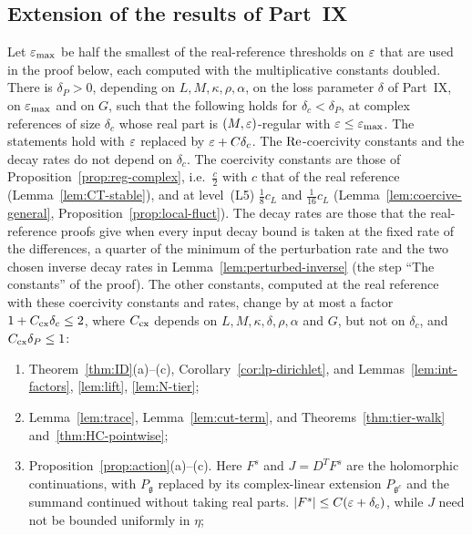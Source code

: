 \subsection{Extension of the results of Part~IX}\label{sec:complex-ext}

\begin{proposition}\label{prop:complex-ext}
Let $\varepsilon_{\max}$ be half the smallest of the real-reference thresholds on $\varepsilon$ that are used in the proof below, each computed with the multiplicative constants doubled. There is $\delta_P>0$, depending on $L,M,\kappa,\rho,\alpha$, on the loss parameter $\delta$ of Part~IX, on $\varepsilon_{\max}$ and on $G$, such that the following holds for $\delta_c<\delta_P$, at complex references of size $\delta_c$ whose real part is $(M,\varepsilon)$-regular with $\varepsilon\le\varepsilon_{\max}$. The statements hold with $\varepsilon$ replaced by $\varepsilon+C\delta_c$. The $\operatorname{Re}$-coercivity constants and the decay rates do not depend on $\delta_c$. The coercivity constants are those of Proposition~\ref{prop:reg-complex}, i.e.\ $\frac c2$ with $c$ that of the real reference (Lemma~\ref{lem:CT-stable}), and at level~(L5) $\frac18c_L$ and $\frac1{16}c_L$ (Lemma~\ref{lem:coercive-general}, Proposition~\ref{prop:local-fluct}). The decay rates are those that the real-reference proofs give when every input decay bound is taken at the fixed rate of the differences, a quarter of the minimum of the perturbation rate and the two chosen inverse decay rates in Lemma~\ref{lem:perturbed-inverse} (the step ``The constants'' of the proof). The other constants, computed at the real reference with these coercivity constants and rates, change by at most a factor $1+C_{\rm cx}\delta_c\le2$, where $C_{\rm cx}$ depends on $L,M,\kappa,\delta,\rho,\alpha$ and $G$, but not on $\delta_c$, and $C_{\rm cx}\delta_P\le1$:
\begin{enumerate}[label=(\alph*)]
\item Theorem~\ref{thm:ID}(a)--(c), Corollary~\ref{cor:lp-dirichlet}, and Lemmas~\ref{lem:int-factors}, \ref{lem:lift}, \ref{lem:N-tier};
\item Lemma~\ref{lem:trace}, Lemma~\ref{lem:cut-term}, and Theorems~\ref{thm:tier-walk} and~\ref{thm:HC-pointwise};
\item Proposition~\ref{prop:action}(a)--(c). Here $F^s$ and $J=D^TF^s$ are the holomorphic continuations, with $P_{\mathfrak g}$ replaced by its complex-linear extension $P_{\mathfrak g^c}$ and the summand continued without taking real parts. $|F^s|\le C(\varepsilon+\delta_c)$, while $J$ need not be bounded uniformly in $\eta$;

\end{enumerate}
\end{proposition}
